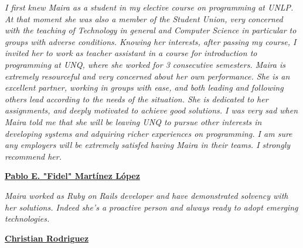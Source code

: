 


\textit{I first knew Maira as a student in my elective course on programming at UNLP. At that moment she was also a member of the Student Union, very concerned with the teaching of Technology in general and Computer Science in particular to groups with adverse conditions. Knowing her interests, after passing my course, I invited her to work as teacher assistant in a course for introduction to programming at UNQ, where she worked for 3 consecutive semesters.
Maira is extremely resourceful and very concerned about her own performance. She is an excellent partner, working in groups with ease, and both leading and following others lead according to the needs of the situation. She is dedicated to her assignments, and deeply motivated to achieve good solutions.
I was very sad when Maira told me that she will be leaving UNQ to pursue other interests in developing systems and adquiring richer experiences on programming. I am sure any employers will be extremely satisfed having Maira in their teams. I strongly recommend her.}

\href{https://www.linkedin.com/in/fidelml/}{\textbf{Pablo E. "Fidel" Martínez López}}
\divider

\textit{Maira worked as Ruby on Rails developer and have demonstrated solvency with her solutions. Indeed she's a proactive person and always ready to adopt emerging technologies.}

\href{https://www.linkedin.com/in/christian-rodriguez-419b8234/}{\textbf{Christian Rodriguez}}